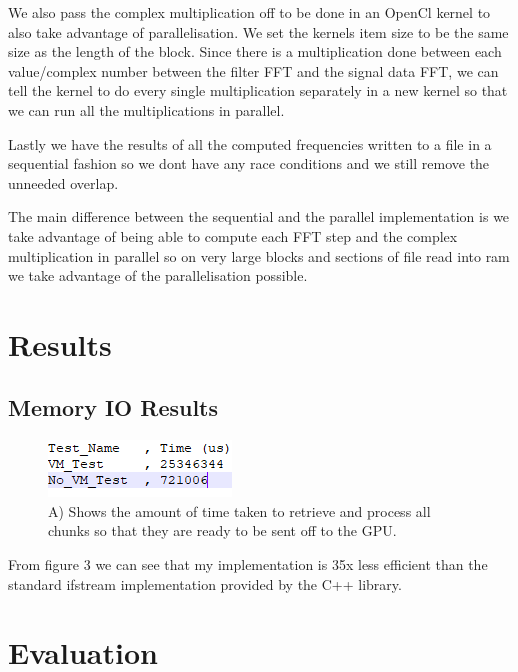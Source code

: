 \documentclass{article}
\begin{document}
We also pass the complex multiplication off to be done in an OpenCl kernel to also take advantage of parallelisation. We set the kernels item size to be the same size as the length of the block. Since there is a multiplication done between each value/complex number between the filter FFT and the signal data FFT, we can tell the kernel to do every single multiplication separately in a new kernel so that we can run all the multiplications in parallel. 

Lastly we have the results of all the computed frequencies written to a file in a sequential fashion so we dont have any race conditions and we still remove the unneeded overlap.

The main difference between the sequential and the parallel implementation is we take advantage of being able to compute each FFT step and the complex multiplication in parallel so on very large blocks and sections of file read into ram we take advantage of the parallelisation possible.

\section{Results}

\subsection{Memory IO Results}

\begin{figure}[!htb]
	\includegraphics[width=\linewidth]{results1.png}
	\caption{A) Shows the amount of time taken to retrieve and process all chunks so that they are ready to be sent off to the GPU.}
	\label{fig:results1}
\end{figure}

From figure 3 we can see that my implementation is 35x less efficient than the standard ifstream implementation provided by the C++ library.

\section{Evaluation}
\end{document}
